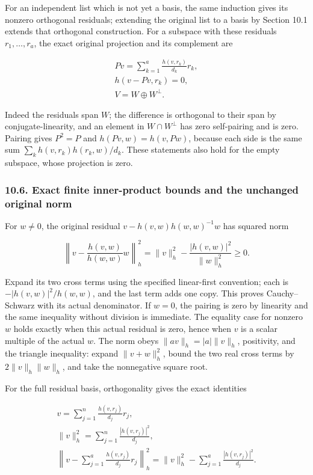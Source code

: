 \documentclass[
  11pt,
]{article}
\begin{document}
For an independent list which is not yet a basis, the same induction
gives its nonzero orthogonal residuals; extending the original list to a
basis by Section 10.1 extends that orthogonal construction. For a
subspace with these residuals \(r_1,\ldots,r_a\), the exact original
projection and its complement are

\[
\begin{gathered}
Pv=\sum_{k=1}^a\frac{h(v,r_k)}{d_k}r_k, \\  h(v-Pv,r_k)=0, \\ V=W\oplus W^\perp.
\end{gathered}
\tag{FA19}
\]

Indeed the residuals span \(W\); the difference is orthogonal to their
span by conjugate-linearity, and an element in \(W\cap W^\perp\) has
zero self-pairing and is zero. Pairing gives \(P^2=P\) and
\(h(Pv,w)=h(v,Pw)\), because each side is the same sum
\(\sum_k h(v,r_k)h(r_k,w)/d_k\). These statements also hold for the
empty subspace, whose projection is zero.

\subsubsection{10.6. Exact finite inner-product bounds and the unchanged
original
norm}\label{exact-finite-inner-product-bounds-and-the-unchanged-original-norm}

For \(w\ne0\), the original residual \(v-h(v,w)h(w,w)^{-1}w\) has
squared norm

\[
\left\|v-\frac{h(v,w)}{h(w,w)}w\right\|_h^2
=\|v\|_h^2-\frac{|h(v,w)|^2}{\|w\|_h^2}\ge0.
\tag{FA20}
\]

Expand its two cross terms using the specified linear-first convention;
each is \(-|h(v,w)|^2/h(w,w)\), and the last term adds one copy. This
proves Cauchy--Schwarz with its actual denominator. If \(w=0\), the
pairing is zero by linearity and the same inequality without division is
immediate. The equality case for nonzero \(w\) holds exactly when this
actual residual is zero, hence when \(v\) is a scalar multiple of the
actual \(w\). The norm obeys \(\|av\|_h=|a|\|v\|_h\), positivity, and
the triangle inequality: expand \(\|v+w\|_h^2\), bound the two real
cross terms by \(2\|v\|_h\|w\|_h\), and take the nonnegative square
root.

For the full residual basis, orthogonality gives the exact identities

\[
\begin{gathered}
v=\sum_{j=1}^n\frac{h(v,r_j)}{d_j}r_j, \\  \|v\|_h^2=\sum_{j=1}^n\frac{|h(v,r_j)|^2}{d_j}, \\ \left\|v-\sum_{j=1}^a\frac{h(v,r_j)}{d_j}r_j\right\|_h^2
=\|v\|_h^2-\sum_{j=1}^a\frac{|h(v,r_j)|^2}{d_j}.
\end{gathered}
\tag{FA21}
\]
\end{document}
